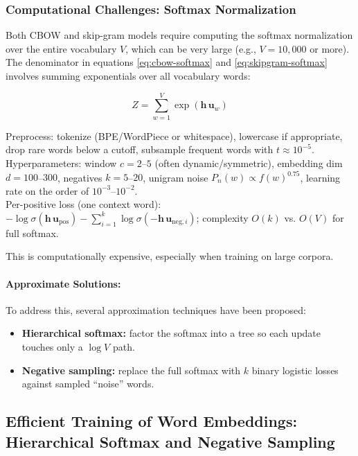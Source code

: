 \subsubsection{Computational Challenges: Softmax Normalization}
\label{sec:nlp_computational_challenges_softmax_normalization_sub}

Both CBOW and skip-gram models require computing the softmax normalization over the entire vocabulary \( V \), which can be very large (e.g., \( V = 10,000 \) or more). The denominator in equations \eqref{eq:cbow-softmax} and \eqref{eq:skipgram-softmax} involves summing exponentials over all vocabulary words:

\[
Z = \sum_{w=1}^V \exp(\mathbf{h}\,\mathbf{u}_w)
\]

\begin{tcolorbox}[summarybox, title={Recipe: skip-gram with negative sampling}]
Preprocess: tokenize (BPE/WordPiece or whitespace), lowercase if appropriate, drop rare words below a cutoff, subsample frequent words with \(t\approx 10^{-5}\).\\
Hyperparameters: window \(c=2\)--\(5\) (often dynamic/symmetric), embedding dim \(d=100\)--\(300\), negatives \(k=5\)--\(20\), unigram noise \(P_n(w)\propto f(w)^{0.75}\), learning rate on the order of \(10^{-3}\)--\(10^{-2}\).\\
Per-positive loss (one context word): \(-\log \sigma(\mathbf{h}\,\mathbf{u}_{\text{pos}}) - \sum_{i=1}^k \log \sigma(-\mathbf{h}\,\mathbf{u}_{\text{neg}, i})\); complexity \(O(k)\) vs. \(O(V)\) for full softmax.
\end{tcolorbox}

This is computationally expensive, especially when training on large corpora.

\paragraph{Approximate Solutions:} To address this, several approximation techniques have been proposed:

\begin{itemize}
    \item \textbf{Hierarchical softmax:} factor the softmax into a tree so each update touches only a \(\log V\) path.
    \item \textbf{Negative sampling:} replace the full softmax with \(k\) binary logistic losses against sampled ``noise'' words.
\end{itemize}
\subsection{Efficient Training of Word Embeddings: Hierarchical Softmax and Negative Sampling}
\label{sec:nlp_efficient_training_of_word_embeddings_hierarchical_softmax_and_negative_sampling}

